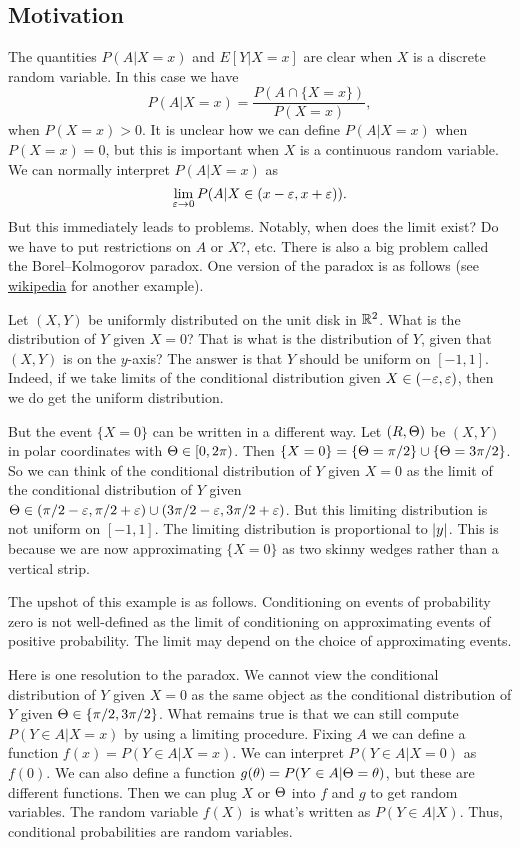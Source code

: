\subsection{Motivation}
The quantities $P(A|X=x)$ and $E[Y|X=x]$ are clear when $X$ is a discrete random variable. In this case we have 
\[P(A |X=x) = \frac{P(A \cap \{X=x\})}{P(X=x)}, \]
when $P(X=x) > 0$. It is unclear how we can define $P(A|X=x)$ when $P(X=x)=0$, but this is important when $X$ is a continuous random variable. We can normally interpret $P(A|X=x)$ as
\[\lim_{\varepsilon \to 0} P(A |X\in (x-\varepsilon,x+\varepsilon)). \]
But this immediately leads to problems. Notably, when does the limit exist? Do we have to put restrictions on $A$ or $X$?, etc.  There is also a big problem called the Borel--Kolmogorov paradox. One version of the paradox is as follows (see \href{https://en.wikipedia.org/wiki/Borel%E2%80%93Kolmogorov_paradox}{wikipedia} for another example). 
\begin{example}
    Let $(X,Y)$ be uniformly distributed on the unit disk in ${\mathbb R}^2$. What is the distribution of $Y$ given $X=0$? That is what is the distribution of $Y$, given that $(X,Y)$ is on the $y$-axis? The answer is that $Y$ should be uniform on $[-1,1]$. Indeed, if we take limits of the conditional distribution given $X\in (-\varepsilon,\varepsilon)$, then we do get the uniform distribution. 

    But the event $\{X=0\}$ can be written in a different way. Let $(R,{\Theta})$ be $(X,Y)$ in polar coordinates with ${\Theta} \in [0,2\pi)$.  Then $\{X=0\}=\{{\Theta} = \pi/2\} \cup \{{\Theta} = 3\pi/2\}$. So we can think of the conditional distribution of $Y$ given $X=0$ as the limit of the conditional distribution of $Y$ given ${\Theta} \in (\pi/2-\varepsilon,\pi/2+\varepsilon) \cup(3\pi/2 - \varepsilon, 3\pi/2+\varepsilon)$. But this limiting distribution is not uniform on $[-1,1]$. The limiting distribution is proportional to ${\left\lvert y\right\rvert}$. This is because we are now approximating $\{X=0\}$ as two skinny wedges rather than a vertical strip.
\end{example} 
The upshot of this example is as follows. Conditioning on events of probability zero is not well-defined as the limit of conditioning on approximating events of positive probability. The limit may depend on the choice of approximating events. 

Here is one resolution to the paradox. We cannot view the conditional distribution of $Y$ given $X=0$ as the same object as the conditional distribution of $Y$ given ${\Theta} \in \{\pi/2, 3\pi/2\}$. What remains true is that we can still compute $P(Y \in A |X=x)$ by using a limiting procedure. Fixing $A$ we can define a function $f(x) = P(Y \in A |X=x)$. We can interpret $P(Y \in A|X=0)$ as $f(0)$. We can also define a function $g({\theta}) = P(Y \in A|{\Theta}={\theta})$, but these are different functions. Then we can plug $X$ or ${\Theta}$ into $f$ and $g$ to get random variables. The random variable $f(X)$ is what's written as $P(Y \in A|X)$. Thus, conditional probabilities are random variables.

